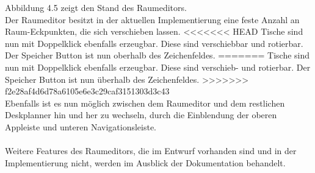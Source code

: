 Abbildung 4.5 zeigt den Stand des Raumeditors. 
\\
Der Raumeditor besitzt in der aktuellen Implementierung eine feste Anzahl an Raum-Eckpunkten, die sich verschieben lassen.
<<<<<<< HEAD
Tische sind nun mit Doppelklick ebenfalls erzeugbar. Diese sind verschiebbar und rotierbar. 
Der Speicher Button ist nun oberhalb des Zeichenfeldes. 
=======
Tische sind nun mit Doppelklick ebenfalls erzeugbar. Diese sind verschieb- und rotierbar. 
Der Speicher Button ist nun überhalb des Zeichenfeldes. 
>>>>>>> f2e28af4d6d78a6105e6e3c29caf3151303d3c43
\\
Ebenfalls ist es nun möglich zwischen dem Raumeditor und dem restlichen Deskplanner hin und her zu wechseln, durch die Einblendung der oberen Appleiste und unteren Navigationsleiste.
\\\\
Weitere Features des Raumeditors, die im Entwurf vorhanden sind und in der Implementierung nicht, werden im Ausblick der Dokumentation behandelt.


